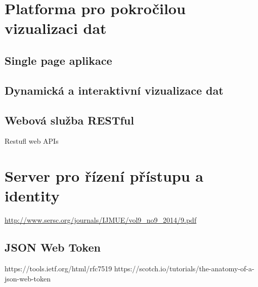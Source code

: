 \section{Platforma pro pokročilou vizualizaci dat}
\subsection{Single page aplikace}
\subsection{Dynamická a interaktivní vizualizace dat}
\subsection{Webová služba RESTful}
Restufl web APIs

\section{Server pro řízení přístupu a identity}
\url{http://www.sersc.org/journals/IJMUE/vol9_no9_2014/9.pdf}

\subsection{JSON Web Token}
https://tools.ietf.org/html/rfc7519
https://scotch.io/tutorials/the-anatomy-of-a-json-web-token
